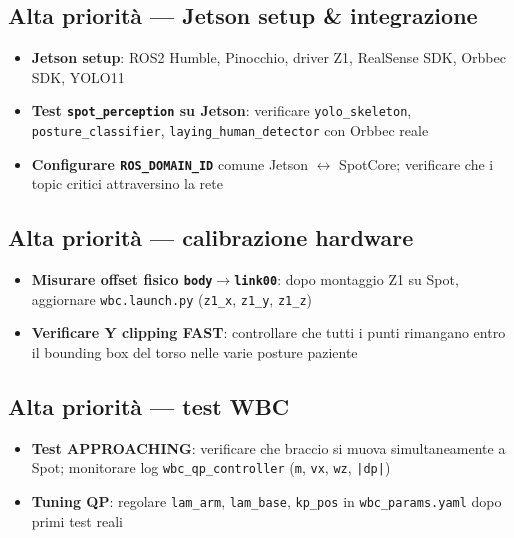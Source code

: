 \documentclass[a4paper,11pt]{article}
\begin{document}
\begin{todobox}
\subsection*{Alta priorità — Jetson setup \& integrazione}
\begin{itemize}[leftmargin=1.5em]
  \item[$\square$] \textbf{Jetson setup}: ROS2 Humble, Pinocchio, driver Z1,
        RealSense SDK, Orbbec SDK, YOLO11
  \item[$\square$] \textbf{Test \texttt{spot\_perception} su Jetson}: verificare
        \texttt{yolo\_skeleton}, \texttt{posture\_classifier}, \texttt{laying\_human\_detector}
        con Orbbec reale
  \item[$\square$] \textbf{Configurare \texttt{ROS\_DOMAIN\_ID}} comune Jetson $\leftrightarrow$ SpotCore;
        verificare che i topic critici attraversino la rete
\end{itemize}

\subsection*{Alta priorità — calibrazione hardware}
\begin{itemize}[leftmargin=1.5em]
  \item[$\square$] \textbf{Misurare offset fisico \texttt{body}$\to$\texttt{link00}}:
        dopo montaggio Z1 su Spot, aggiornare \texttt{wbc.launch.py}
        (\texttt{z1\_x}, \texttt{z1\_y}, \texttt{z1\_z})
  \item[$\square$] \textbf{Verificare Y clipping FAST}: controllare che tutti i punti
        rimangano entro il bounding box del torso nelle varie posture paziente
\end{itemize}

\subsection*{Alta priorità — test WBC}
\begin{itemize}[leftmargin=1.5em]
  \item[$\square$] \textbf{Test APPROACHING}: verificare che braccio si muova
        simultaneamente a Spot; monitorare log \texttt{wbc\_qp\_controller}
        (\texttt{m}, \texttt{vx}, \texttt{wz}, \texttt{|dp|})
  \item[$\square$] \textbf{Tuning QP}: regolare \texttt{lam\_arm}, \texttt{lam\_base},
        \texttt{kp\_pos} in \texttt{wbc\_params.yaml} dopo primi test reali
\end{itemize}


\end{todobox}
\end{document}
